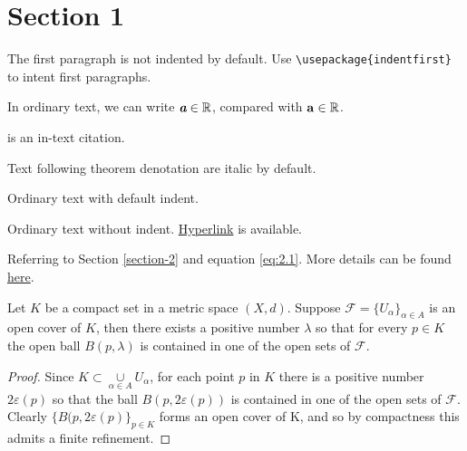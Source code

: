 \section{Section 1} \label{section-1}

The first paragraph is not indented by default. Use \texttt{\textbackslash usepackage\{indentfirst\}} to intent first paragraphs.

In ordinary text, we can write $\textbf{\em a} \in \mathbb{R}$, compared with $\mathbf{a} \in \mathbb{R}$.

\mydef \cite{einstein} is an in-text citation. 

Text following theorem denotation are italic by default.

\rm %

Ordinary text with default indent.

\noindent Ordinary text without indent. \href{https://www.overleaf.com/learn/latex/Hyperlinks}{Hyperlink} is available. 

Referring to Section \ref{section-2} and equation \ref{eq:2.1}. More details can be found \href{https://www.overleaf.com/learn/latex/Cross_referencing_sections%2C_equations_and_floats}{here}.

\thm Let $K$ be a compact set in a metric space $(X,d)$. Suppose $\mathcal{F}=\{U_\alpha\}_{\alpha \in A}$ is an open cover of $K$, then there exists a positive number $\lambda$ so that for every $p \in K$ the open ball $B(p,\lambda)$ is contained in one of the open sets of $\mathcal{F}$.

\begin{proof}

Since $K \subset \underset{\alpha \in A}\cup U_\alpha$, for each point $p$ in $K$ there is a positive number $2\varepsilon(p)$ so that the ball $B(p,2\varepsilon(p))$ is contained in one of the open sets of $\mathcal{F}$. Clearly $\{B(p,2\varepsilon(p)\}_{p \in K}$ forms an open cover of K, and so by compactness this admits a finite refinement.

\end{proof}

\rm %